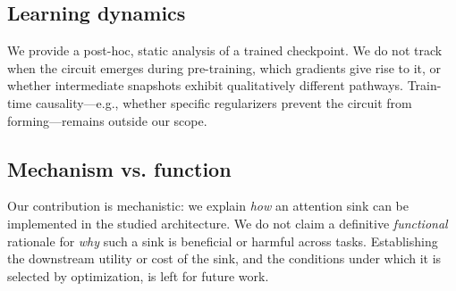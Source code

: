 \documentclass[11pt]{article}
\begin{document}
\subsection{Learning dynamics}
We provide a post-hoc, static analysis of a trained checkpoint. We do not track when the circuit emerges during pre-training, which gradients give rise to it, or whether intermediate snapshots exhibit qualitatively different pathways. Train-time causality—e.g., whether specific regularizers prevent the circuit from forming—remains outside our scope.

\subsection{Mechanism vs. function}
Our contribution is mechanistic: we explain \emph{how} an attention sink can be implemented in the studied architecture. We do not claim a definitive \emph{functional} rationale for \emph{why} such a sink is beneficial or harmful across tasks. Establishing the downstream utility or cost of the sink, and the conditions under which it is selected by optimization, is left for future work.






\appendix

\section{}\label{app:bias_term}
\end{document}

